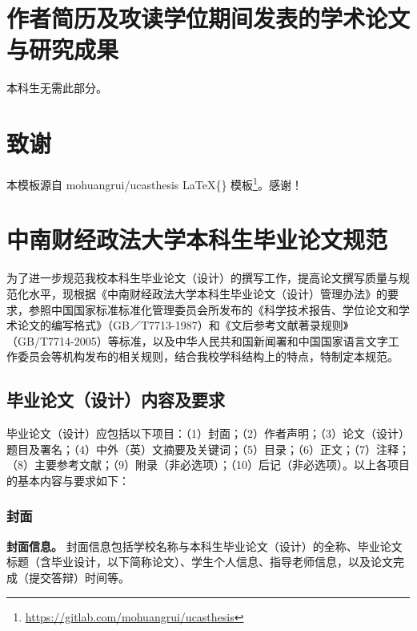 \documentclass[singlesided]{Style/ucasthesis}%
\begin{document}
\hypertarget{section-7}{%
\chapter{作者简历及攻读学位期间发表的学术论文与研究成果}\label{section-7}}

本科生无需此部分。

\hypertarget{section-8}{%
\chapter{致谢}\label{section-8}}

本模板源自 mohuangrui/ucasthesis \LaTeX\{\} 模板\footnote{\url{https://gitlab.com/mohuangrui/ucasthesis}}。感谢！

\appendix

\hypertarget{section-9}{%
\chapter{中南财经政法大学本科生毕业论文规范}\label{section-9}}

\raggedbottom

为了进一步规范我校本科生毕业论文（设计）的撰写工作，提高论文撰写质量与规范化水平，现根据《中南财经政法大学本科生毕业论文（设计）管理办法》的要求，参照中国国家标准标准化管理委员会所发布的《科学技术报告、学位论文和学术论文的编写格式》（GB／T7713-1987）和《文后参考文献著录规则》（GB/T7714-2005）等标准，以及中华人民共和国新闻署和中国国家语言文字工作委员会等机构发布的相关规则，结合我校学科结构上的特点，特制定本规范。

\hypertarget{section-10}{%
\section{毕业论文（设计）内容及要求}\label{section-10}}

毕业论文（设计）应包括以下项目：（1）封面；（2）作者声明；（3）论文（设计）题目及署名；（4）中外（英）文摘要及关键词；（5）目录；（6）正文；（7）注释；（8）主要参考文献；（9）附录（非必选项）；（10）后记（非必选项）。以上各项目的基本内容与要求如下：

\hypertarget{section-11}{%
\subsection{封面}\label{section-11}}

\textbf{封面信息。} 封面信息包括学校名称与本科生毕业论文（设计）的全称、毕业论文标题（含毕业设计，以下简称论文）、学生个人信息、指导老师信息，以及论文完成（提交答辩）时间等。
\end{document}
